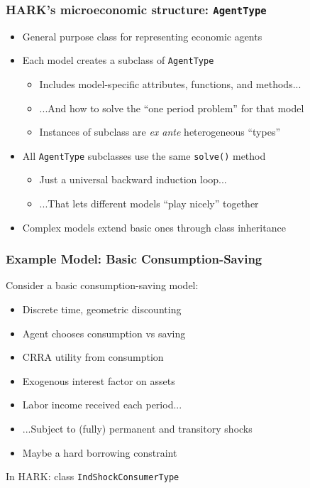 \documentclass[11ptt]{beamer}
\newcommand{\bi}{\begin{itemize}}
\newcommand{\ei}{\end{itemize}}
\begin{document}
\begin{frame}
\frametitle{HARK's microeconomic structure: \texttt{AgentType}}
\bi
\item <1->General purpose class for representing economic agents

\item<1-> Each model creates a subclass of \texttt{AgentType}
\bi
\item Includes model-specific attributes, functions, and methods...

\item ...And how to solve the ``one period problem'' for that model

\item Instances of subclass are \textit{ex ante} heterogeneous ``types''
\ei
\item <2-> All \texttt{AgentType} subclasses use the same \texttt{solve()} method
\bi
\item Just a universal backward induction loop...

\item ...That lets different models ``play nicely'' together
\ei
\item <3->Complex models extend basic ones through class inheritance
\ei
\end{frame}




\begin{frame}\label{ModelStatement}
\frametitle{Example Model: Basic Consumption-Saving}

Consider a basic consumption-saving model: \hyperlink{ModelMath}{}
\begin{itemize}
\item Discrete time, geometric discounting

\item Agent chooses consumption vs saving

\item CRRA utility from consumption

\item Exogenous interest factor on assets

\item Labor income received each period...

\item ...Subject to (fully) permanent and transitory shocks

\item Maybe a hard borrowing constraint
\end{itemize}

In HARK: class \texttt{IndShockConsumerType}

\end{frame}
\end{document}
